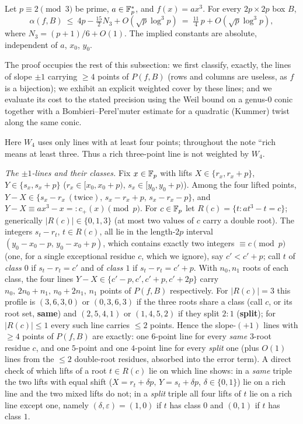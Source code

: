 \begin{theorem}\label{thm:cubic}
Let $p\equiv2\pmod3$ be prime, $a\in\mathbb{F}_p^*$, and $f(x)=ax^3$. For every $2p\times2p$ box $B$,
\[
\alpha(f,B)\ \le\ 4p-\tfrac{15}2N_3+O(\sqrt p\log^3p)\ =\ \tfrac{11}4\,p+O(\sqrt p\log^3p),
\]
where $N_3=(p+1)/6+O(1)$. The implied constants are absolute, independent of $a$, $x_0$, $y_0$.
\end{theorem}

The proof occupies the rest of this subsection: we first classify, exactly, the lines of slope $\pm1$ carrying $\ge4$
points of $P(f,B)$ (rows and columns are useless, as $f$ is a bijection); we exhibit an explicit weighted cover by
these lines; and we evaluate its cost to the stated precision using the Weil bound on a genus-$0$ conic together
with a Bombieri--Perel'muter estimate for a quadratic (Kummer) twist along the same conic.

Here $W_4$ uses only lines with at least four points; throughout the note ``rich means at least three.  Thus a rich three-point line is not weighted by $W_4$.\par
\smallskip\noindent\emph{The $\pm1$-lines and their classes.} Fix $x\in\mathbb{F}_p$ with lifts $X\in\{r_x,r_x+p\}$,
$Y\in\{s_x,s_x+p\}$ ($r_x\in[x_0,x_0+p)$, $s_x\in[y_0,y_0+p)$). Among the four lifted points,
$Y-X\in\{s_x-r_x\ (\text{twice}),\,s_x-r_x+p,\,s_x-r_x-p\}$, and
$Y-X\equiv ax^3-x=:c_+(x)\pmod p$. For $c\in\mathbb{F}_p$ let $R(c)=\{t:at^3-t=c\}$; generically $|R(c)|\in\{0,1,3\}$ (at
most two values of $c$ carry a double root). The integers $s_t-r_t$, $t\in R(c)$, all lie in the length-$2p$ interval
$(y_0-x_0-p,\,y_0-x_0+p)$, which contains exactly two integers $\equiv c\pmod p$ (one, for a single exceptional
residue $c$, which we ignore), say $c'<c'+p$; call $t$ of
\emph{class $0$} if $s_t-r_t=c'$ and of \emph{class $1$} if $s_t-r_t=c'+p$. With $n_0,n_1$ roots of each class, the
four lines $Y-X\in\{c'-p,c',c'+p,c'+2p\}$ carry $n_0,\,2n_0+n_1,\,n_0+2n_1,\,n_1$ points of $P(f,B)$ respectively.
For $|R(c)|=3$ this profile is $(3,6,3,0)$ or $(0,3,6,3)$ if the three roots share a class (call $c$, or its root
set, \textbf{same}) and $(2,5,4,1)$ or $(1,4,5,2)$ if they split $2\!:\!1$ (\textbf{split}); for $|R(c)|\le1$ every
such line carries $\le2$ points. Hence the slope-$(+1)$ lines with $\ge4$ points of $P(f,B)$ are exactly: one
$6$-point line for every \emph{same} $3$-root residue $c$, and one $5$-point and one $4$-point line for every
\emph{split} one (plus $O(1)$ lines from the $\le2$ double-root residues, absorbed into the error term).
A direct check of which lifts of a root $t\in R(c)$ lie on which line shows: in a \emph{same} triple the two lifts
with equal shift ($X=r_t+\delta p,\,Y=s_t+\delta p$, $\delta\in\{0,1\}$) lie on a rich line and the two mixed lifts
do not; in a \emph{split} triple all four lifts of $t$ lie on a rich line except one, namely $(\delta,\varepsilon)=(1,0)$
if $t$ has class $0$ and $(0,1)$ if $t$ has class $1$.

